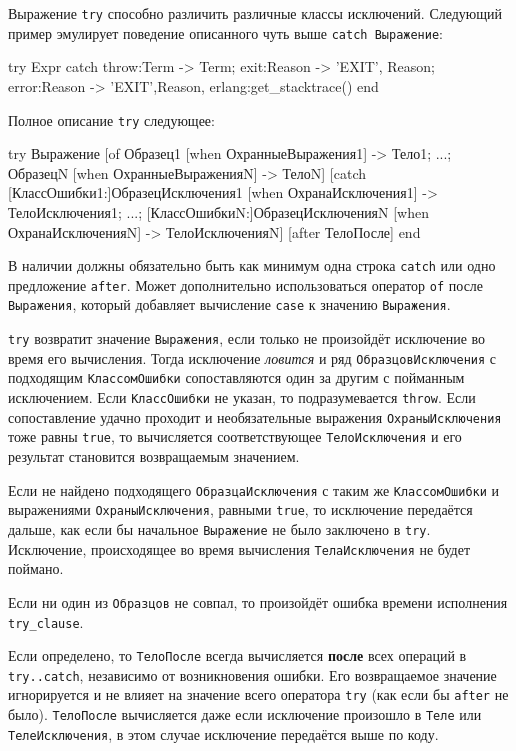 Выражение \texttt{try} способно различить различные классы исключений.  Следующий
пример эмулирует поведение описанного чуть выше \texttt{catch Выражение}:

\begin{erlang}
try Expr
catch
    throw:Term -> Term;
    exit:Reason -> {'EXIT', Reason};
    error:Reason -> {'EXIT',{Reason, erlang:get_stacktrace()}}
end
\end{erlang}

Полное описание \texttt{try} следующее:

\begin{erlangru}
try Выражение [of
    Образец1 [when ОхранныеВыражения1] -> Тело1;
    ...;
    ОбразецN [when ОхранныеВыраженияN] -> ТелоN]
[catch
    [КлассОшибки1:]ОбразецИсключения1 [when ОхранаИсключения1] ->
        ТелоИсключения1;
    ...;
    [КлассОшибкиN:]ОбразецИсключенияN [when ОхранаИсключенияN] ->
        ТелоИсключенияN]
[after ТелоПосле]
end
\end{erlangru}

В наличии должны обязательно быть как минимум одна строка \texttt{catch} или одно
предложение \texttt{after}.  Может дополнительно использоваться оператор
\texttt{of} после \texttt{Выражения}, который добавляет вычисление \texttt{case}
к значению \texttt{Выражения}.

\texttt{try} возвратит значение \texttt{Выражения}, если только не произойдёт 
исключение во время его вычисления.  Тогда исключение \emph{ловится} и ряд 
\texttt{ОбразцовИсключения} с подходящим \texttt{КлассомОшибки} сопоставляются
один за другим с пойманным исключением.  Если \texttt{КлассОшибки} не указан, то
подразумевается \texttt{throw}. Если сопоставление удачно проходит и необязательные
выражения \texttt{ОхраныИсключения} тоже равны \texttt{true}, то вычисляется 
соответствующее \texttt{ТелоИсключения} и его результат становится возвращаемым
значением.

Если не найдено подходящего \texttt{ОбразцаИсключения} с таким же 
\texttt{КлассомОшибки} и выражениями \texttt{ОхраныИсключения}, равными 
\texttt{true}, то исключение передаётся дальше, как если бы начальное 
\texttt{Выражение} не было заключено в \texttt{try}.  Исключение, происходящее
во время вычисления \texttt{ТелаИсключения} не будет поймано.

Если ни один из \texttt{Образцов} не совпал, то произойдёт ошибка времени 
исполнения \texttt{try\_clause}.

Если определено, то \texttt{ТелоПосле} всегда вычисляется \textbf{после} всех 
операций в\linebreak
\texttt{try..catch}, независимо от возникновения ошибки. Его 
возвращаемое значение игнорируется и не влияет на значение всего оператора 
\texttt{try} (как если бы \texttt{after} не было). \texttt{ТелоПосле} вычисляется
даже если исключение произошло в \texttt{Теле} или \texttt{ТелеИсключения}, в этом
случае исключение передаётся выше по коду.

